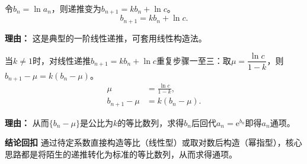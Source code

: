 \begin{proofbox}
\begin{description}[style=nextline,leftmargin=2.8em,labelsep=0.5em,itemsep=0.55em]
			令$b_n=\ln a_n$，则递推变为$b_{n+1}=k b_n+\ln c$。
			\[
				b_{n+1}=k b_n+\ln c.
			\]
			\par\textbf{理由：} 这是典型的一阶线性递推，可套用线性构造法。
		\item[\textbf{步骤六（构造等比求通项）：}]
			当$k\neq1$时，对线性递推$b_{n+1}=k b_n+\ln c$重复步骤一至三：取$\mu=\dfrac{\ln c}{1-k}$，则$b_{n+1}-\mu=k(b_n-\mu)$。
			\[
				\begin{aligned}
					\mu &= \frac{\ln c}{1-k}, \\ b_{n+1}-\mu &= k(b_n-\mu).
			\end{aligned}
			\]
			\par\textbf{理由：} 从而$\{b_n-\mu\}$是公比为$k$的等比数列，求得$b_n$后回代$a_n=\mathrm{e}^{b_n}$即得$a_n$通项。
	\end{description}

	\medskip
	\textbf{\textcolor{CProof}{结论回扣}}
	通过待定系数直接构造等比（线性型）或取对数后构造（幂指型），核心思路都是将陌生的递推转化为标准的等比数列，从而求得通项。
\end{proofbox}
